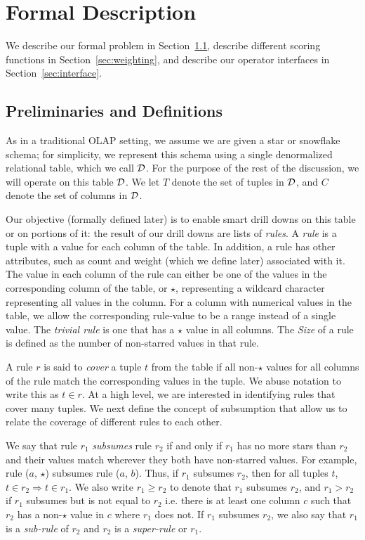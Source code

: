

\section{Formal Description}\label{sec:formal}
We describe our formal problem
in Section~\ref{sec:preliminaries},
describe different scoring functions
in Section~\ref{sec:weighting},
and describe our operator interfaces
in Section~\ref{sec:interface}. 
\subsection{Preliminaries and Definitions}
\label{sec:preliminaries}

 As in a traditional OLAP setting, we assume we are given a 
star or snowflake schema;
for simplicity, we represent this schema using a single denormalized relational table,
which we call $\mathcal{D}$. 
For the purpose of the rest of the discussion, we will operate on this
table $\mathcal{D}$.
We let $T$ denote the set of tuples in $\mathcal{D}$, and $C$ denote 
the set of columns in $\mathcal{D}$.

Our objective (formally defined later) is to 
enable smart drill downs on this table or on portions of it:
the result of our drill downs are lists of {\em rules}. 
A {\em rule} is a tuple with a value for each column of the table. 
In addition, a rule has other attributes, such as count and weight 
(which we define later) associated with it. 
The value in each column of the rule can either be one of the values in the corresponding column of the table, or $\star$, representing a wildcard character representing all values in the column. For a column with numerical values in the table, we allow the corresponding rule-value to be a range instead of a single value. The {\em trivial rule} is one that has a $\star$ value in all columns. The {\em Size} of a rule is defined as the number of non-starred values in that rule.

 A rule $r$ is said to {\em cover} a tuple  $t$ from the table if all non-$\star$ values for all columns of the rule match the corresponding values in the tuple. We abuse notation to write this as $t \in r$. At a high level, we are interested
in identifying rules that cover many tuples. We next define the concept of subsumption that allow us to 
relate the coverage of different rules to each other.

We say that rule $r_1$ {\em subsumes} rule $r_2$ if and only if $r_1$ has no more stars than $r_2$ and their values match wherever they both have non-starred values. For example, rule ($a$, $\star$) subsumes rule ($a$, $b$). Thus, if $r_1$ subsumes $r_2$, then for all tuples $t$, $t \in r_2 \Rightarrow t \in r_1$. We also write $r_1 \geq r_2$ to denote that $r_1$ subsumes $r_2$, and $r_1 > r_2$ if $r_1$ subsumes but is not equal to $r_2$ i.e. there is at least one column $c$ such that $r_2$ has a non-$\star$ value in $c$ where $r_1$ does not. If $r_1$ subsumes $r_2$, we also say that $r_1$ is a {\em sub-rule} of $r_2$ and $r_2$ is a {\em super-rule} or $r_1$.

